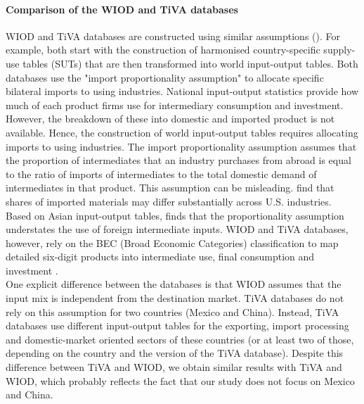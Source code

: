 \documentclass[12pt,a4paper]{paper}
\begin{document}
\paragraph{Comparison of the WIOD and TiVA databases}
WIOD and TiVA databases are constructed using similar assumptions (\cite{OECD2011,Timmer2015,OECD2018}).
For example, both start with the construction of harmonised country-specific supply-use tables (SUTs) that are then transformed into world input-output tables.
Both databases use the "import proportionality assumption" to allocate specific bilateral imports to using industries.
National input-output statistics provide how much of each product firms use for intermediary consumption and investment. 
However, the breakdown of these into domestic and imported product is not available. 
Hence, the construction of world input-output tables requires allocating imports to using industries.
The import proportionality assumption assumes that the proportion of intermediates that an industry purchases from abroad is equal to the ratio of imports of intermediates to the total domestic demand of intermediates in that product. 
This assumption can be misleading. \cite{Feenstra2012} find that shares of imported materials may differ substantially across U.S. industries. Based on Asian input-output tables, \cite{Puzzello2012} finds that the proportionality assumption understates the use of foreign intermediate inputs. WIOD and TiVA databases, however, rely on the BEC (Broad Economic Categories) classification to map detailed six-digit products into intermediate use, final consumption and investment \citep{Dietzenbacher2013}. \\
One explicit difference between the databases is that WIOD assumes that the input mix is independent from the destination market. 
TiVA databases do not rely on this assumption for two countries (Mexico and China). Instead, TiVA databases use different input-output tables for the exporting, import processing and domestic-market oriented sectors of these countries (or at least two of those, depending on the country and the version of the TiVA database). Despite this difference between TiVA and WIOD, we obtain similar results with TiVA and WIOD, which probably reflects the fact that our study does not focus on Mexico and China.\\
\end{document}
